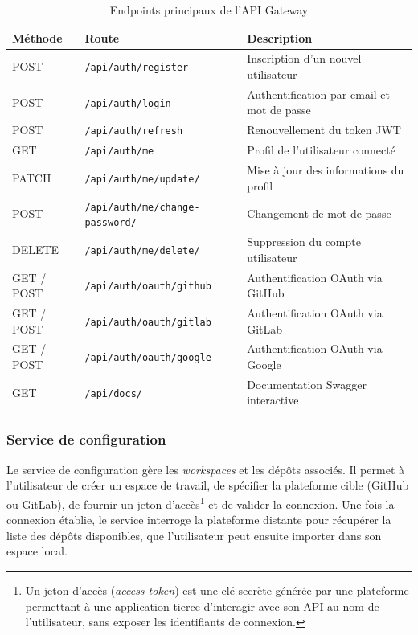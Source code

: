 \begin{table}[H]
\centering
\small
\caption{Endpoints principaux de l'API Gateway}
\label{tab:endpoints-gateway}
\begin{tabular}{|>{\centering\arraybackslash}p{1.6cm}
                |>{\raggedright\arraybackslash}p{6.2cm}
                |>{\raggedright\arraybackslash}p{4.8cm}|}
\hline
\textbf{Méthode} & \textbf{Route} & \textbf{Description} \\
\hline
POST & \texttt{/api/auth/register} & Inscription d'un nouvel utilisateur \\
\hline
POST & \texttt{/api/auth/login} & Authentification par email et mot de passe \\
\hline
POST & \texttt{/api/auth/refresh} & Renouvellement du token JWT \\
\hline
GET & \texttt{/api/auth/me} & Profil de l'utilisateur connecté \\
\hline
PATCH & \texttt{/api/auth/me/update/} & Mise à jour des informations du profil \\
\hline
POST & \texttt{/api/auth/me/change-password/} & Changement de mot de passe \\
\hline
DELETE & \texttt{/api/auth/me/delete/} & Suppression du compte utilisateur \\
\hline
GET / POST & \texttt{/api/auth/oauth/github} & Authentification OAuth via GitHub \\
\hline
GET / POST & \texttt{/api/auth/oauth/gitlab} & Authentification OAuth via GitLab \\
\hline
GET / POST & \texttt{/api/auth/oauth/google} & Authentification OAuth via Google \\
\hline
GET & \texttt{/api/docs/} & Documentation Swagger interactive \\
\hline
\end{tabular}
\end{table}

\subsubsection{Service de configuration}

Le service de configuration gère les \textit{workspaces} et les dépôts associés. Il permet à
l'utilisateur de créer un espace de travail, de spécifier la plateforme cible (GitHub ou GitLab),
de fournir un jeton d'accès\footnote{Un jeton d'accès (\textit{access token}) est une clé secrète
générée par une plateforme permettant à une application tierce d'interagir avec son API au nom de
l'utilisateur, sans exposer les identifiants de connexion.} et de valider la connexion. Une fois
la connexion établie, le service interroge la plateforme distante pour récupérer la liste des
dépôts disponibles, que l'utilisateur peut ensuite importer dans son espace local.

